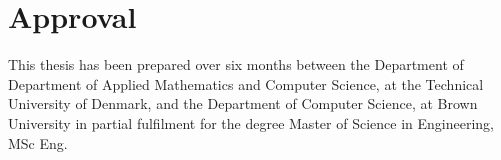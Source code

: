 \section*{Approval}
This thesis has been prepared over six months between the Department of Department of Applied Mathematics and Computer Science, at the Technical University of Denmark, and the Department of Computer Science, at Brown University in partial fulfilment for the degree Master of Science in Engineering, MSc Eng. 

\vfill

\begin{center}
\namesigdate{\thesisauthor~-~\studentnumber}
\end{center}

\vfill
